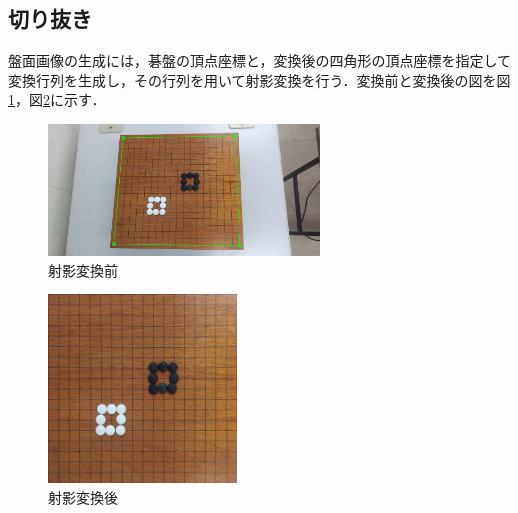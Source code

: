 \documentclass[openright]{nitocs}
\numberwithin{equation}{section}
\begin{document}
        \subsection{切り抜き}
            盤面画像の生成には，碁盤の頂点座標と，変換後の四角形の頂点座標を指定して変換行列を生成し，その行列を用いて射影変換を行う．変換前と変換後の図を図\ref{cornerImg}，図\ref{boardImg}に示す．
            \begin{figure}[tb] %
                \begin{center}
                \includegraphics[width=72mm,height=35mm]{cornerImg.jpg} 
                \caption{射影変換前}
                \label{cornerImg}
                \end{center}
            \end{figure}
            \begin{figure}[tb] %
                \begin{center}
                \includegraphics[width=50mm,height=50mm]{boardImg.jpg} 
                \caption{射影変換後}
                \label{boardImg}
                \end{center}
            \end{figure}
\end{document}
